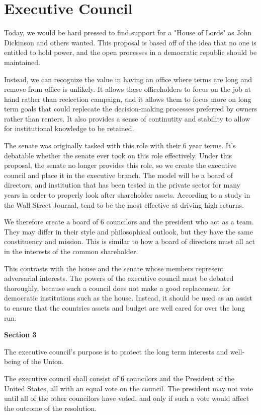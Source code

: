 \documentclass{article}
\begin{document}
\section{Executive Council}

Today, we would be hard pressed to find support for a "House of Lords" as John Dickinson and others wanted. This proposal is based off of the idea that no one is entitled to hold power, and the open processes in a democratic republic should be maintained.

Instead, we can recognize the value in having an office where terms are long and remove from office is unlikely. It allows these officeholders to focus on the job at hand rather than reelection campaign, and it allows them to focus more on long term goals that could replecate the decision-making processes preferred by owners rather than renters. It also provides a sense of continutity and stability to allow for institutional knowledge to be retained.

The senate was originally tasked with this role with their 6 year terms. It's debatable whether the senate ever took on this role effectively. Under this proposal, the senate no longer provides this role, so we create the executive council and place it in the executive branch. The model will be a board of directors, and institution that has been tested in the private sector for many years in order to properly look after shareholder assets. According to a study in the Wall Street Journal, tend to be the most effective at driving high returns\cite{Lublin}.

We therefore create a board of 6 councilors and the president who act as a team. They may differ in their style and philosophical outlook, but they have the same constituency and mission. This is similar to how a board of directors must all act in the interests of the common shareholder.

This contrasts with the house and the senate whose members represent adversarial interests. The powers of the executive council must be debated thoroughly, because such a council does not make a good replacement for democratic institutions such as the house. Instead, it should be used as an assist to ensure that the countries assets and budget are well cared for over the long run.

\begin{quoting}
\textbf{Section 3}

The executive council’s purpose is to protect the long term interests and well-being of the Union.

The executive council shall consist of 6 councilors and the President of the United States, all with an equal vote on the council. The president may not vote until all of the other councilors have voted, and only if such a vote would affect the outcome of the resolution.
\end{quoting}
\end{document}
